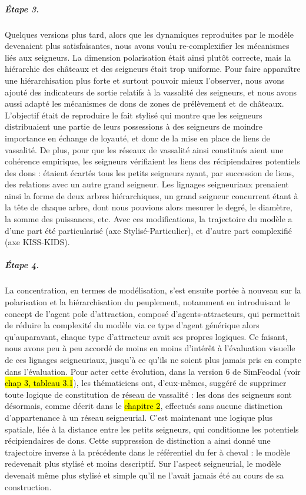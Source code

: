 \subparagraph{Étape 3.}Quelques versions plus tard, alors que les dynamiques reproduites par le modèle devenaient plus satisfaisantes, nous avons voulu re-complexifier les mécanismes liés aux seigneurs.
La dimension polarisation était ainsi plutôt correcte, mais la hiérarchie des châteaux et des seigneurs était trop uniforme.
Pour faire apparaître une hiérarchisation plus forte et surtout pouvoir mieux l'observer, nous avons ajouté des indicateurs de sortie relatifs à la vassalité des seigneurs, et nous avons aussi adapté les mécanismes de dons de zones de prélèvement et de châteaux.
L'objectif était de reproduire le fait stylisé qui montre que les seigneurs distribuaient une partie de leurs possessions à des seigneurs de moindre importance en échange de loyauté, et donc de la mise en place de liens de vassalité.
De plus, pour que les réseaux de vassalité ainsi constitués aient une cohérence empirique, les seigneurs vérifiaient les liens des récipiendaires potentiels des dons : étaient écartés tous les petits seigneurs ayant, par succession de liens, des relations avec un autre grand seigneur.
Les lignages seigneuriaux prenaient ainsi la forme de deux arbres hiérarchiques, un grand seigneur concurrent étant à la tête de chaque arbre, dont nous pouvions alors mesurer le degré, le diamètre, la somme des puissances, etc.
Avec ces modifications, la trajectoire du modèle a d'une part été particularisé (axe Stylisé-Particulier), et d'autre part complexifié (axe KISS-KIDS).

\subparagraph{Étape 4.}La concentration, en termes de modélisation, s'est ensuite portée à nouveau sur la polarisation et la hiérarchisation du peuplement, notamment en introduisant le concept de l'agent \og pole d'attraction\fg{}, composé d'agents-attracteurs, qui permettait de réduire la complexité du modèle via ce type d'agent générique alors qu'auparavant, chaque type d'attracteur avait ses propres logiques.
Ce faisant, nous avons peu à peu accordé de moins en moins d'intérêt à l'évaluation visuelle de ces lignages seigneuriaux, jusqu'à ce qu'ils ne soient plus jamais pris en compte dans l'évaluation.
Pour acter cette évolution, dans la version 6 de SimFeodal (voir \hl{chap 3, tableau 3.1}), les thématiciens ont, d'eux-mêmes, suggéré de supprimer toute logique de constitution de réseau de vassalité : les dons des seigneurs sont désormais, comme décrit dans le \hl{chapitre 2}, effectués sans aucune distinction d'appartenance à un réseau seigneurial.
C'est maintenant une logique plus spatiale, liée à la distance entre les petits seigneurs, qui conditionne les potentiels récipiendaires de dons.
Cette suppression de distinction a ainsi donné une trajectoire inverse à la précédente dans le référentiel du fer à cheval : le modèle redevenait plus stylisé et moins descriptif.
Sur l'aspect seigneurial, le modèle devenait même plus stylisé et simple qu'il ne l'avait jamais été au cours de sa construction.

